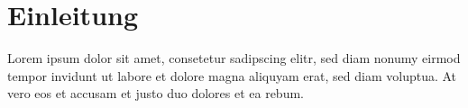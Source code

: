 \chapter{Einleitung}
Lorem ipsum dolor sit amet, consetetur sadipscing elitr, sed diam nonumy eirmod tempor invidunt ut labore et dolore magna aliquyam erat, sed diam voluptua. At vero eos et accusam et justo duo dolores et ea rebum.

